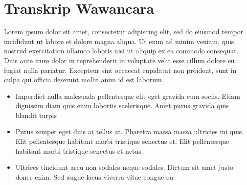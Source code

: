 \documentclass[12pt,hidelinks]{report}
\begin{document}
\chapter{Transkrip Wawancara}
    Lorem ipsum dolor sit amet, consectetur adipiscing elit, sed do eiusmod tempor incididunt ut labore et dolore magna aliqua. Ut enim ad minim veniam, quis nostrud exercitation ullamco laboris nisi ut aliquip ex ea commodo consequat. Duis aute irure dolor in reprehenderit in voluptate velit esse cillum dolore eu fugiat nulla pariatur. Excepteur sint occaecat cupidatat non proident, sunt in culpa qui officia deserunt mollit anim id est laborum.

\begin{itemize}
  \item Imperdiet nulla malesuada pellentesque elit eget gravida cum sociis. Etiam dignissim diam quis enim lobortis scelerisque. Amet purus gravida quis blandit turpis
  \item Purus semper eget duis at tellus at. Pharetra massa massa ultricies mi quis. Elit pellentesque habitant morbi tristique senectus et. Elit pellentesque habitant morbi tristique senectus et netus.
  \item Ultrices tincidunt arcu non sodales neque sodales. Dictum sit amet justo donec enim. Sed augue lacus viverra vitae congue eu
\end{itemize}
\end{document}
